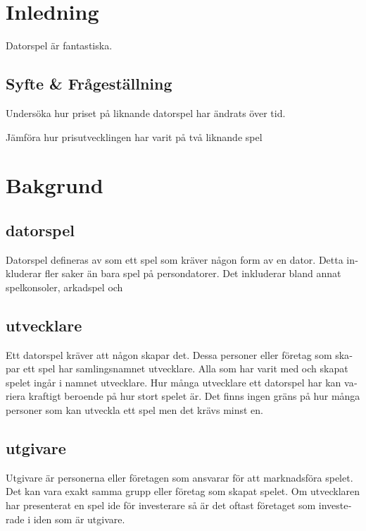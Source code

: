 \documentclass[11p]{article}
\begin{document}
    \begin{otherlanguage}{swedish}
    \tableofcontents

    \newpage

\setlength{\parskip}{10pt}

\section{Inledning}
    Datorspel är fantastiska.%


\subsection{Syfte & Frågeställning}
    Undersöka hur priset på liknande datorspel har ändrats över tid.


    Jämföra hur prisutvecklingen har varit på två liknande spel
\section{Bakgrund}

    \subsection{datorspel}
    Datorspel defineras av \textcite{ComputerSweden} som ett spel som kräver någon form av en dator.
    Detta inkluderar fler saker än bara spel på persondatorer.
    Det inkluderar bland annat spelkonsoler, arkadspel och

    \subsection{utvecklare}
    Ett datorspel kräver att någon skapar det.
    Dessa personer eller företag som skapar ett spel har samlingsnamnet utvecklare.
    Alla som har varit med och skapat spelet ingår i namnet utvecklare.
    Hur många utvecklare ett datorspel har kan variera kraftigt beroende på hur stort spelet är.
    Det finns ingen gräns på hur många personer som kan utveckla ett spel men det krävs minst en.

    \subsection{utgivare}
    Utgivare är personerna eller företagen som ansvarar för att marknadsföra spelet.
    Det kan vara exakt samma grupp eller företag som skapat spelet.
    Om utvecklaren har presenterat en spel ide för investerare så är det oftast företaget som investerade i iden som är utgivare.



\end{otherlanguage}
\end{document}
